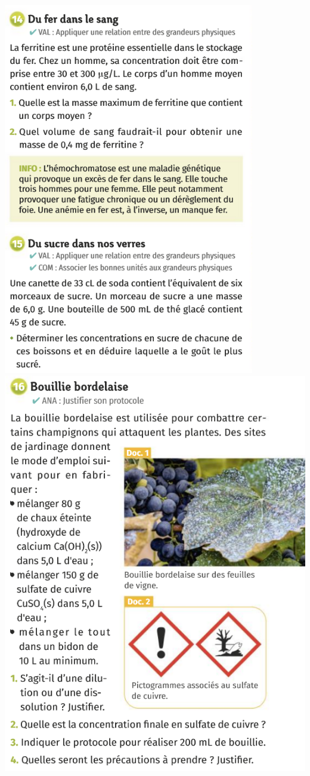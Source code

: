 \begin{center}
\includegraphics[scale=1.1]{Images/Ex_14.png}
\vspace{1cm}
\includegraphics[scale=0.9]{Images/Ex_16.png}

\end{center}
